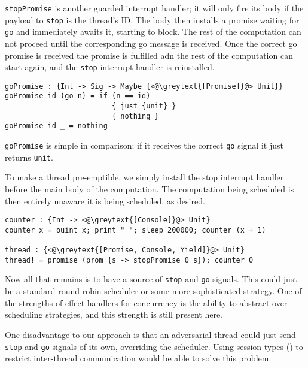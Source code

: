 \documentclass[msc,deptreport,cs]{infthesis} %
\newcommand{\code}[1]{\lstinline{#1}}
\newcommand{\greytext}[1]{\textcolor{black!40}{#1}}
\begin{document}
\code{stopPromise} is another guarded interrupt handler; it will only fire its
body if the payload to \code{stop} is the thread's ID. The body then installs a
promise waiting for \code{go} and immediately awaits it, starting to block. The
rest of the computation can not proceed until the corresponding go message is
received. Once the correct go promise is received the promise is fulfilled adn
the rest of the computation can start again, and the \code{stop} interrupt
handler is reinstalled.

\begin{lstlisting}
goPromise : {Int -> Sig -> Maybe {<@\greytext{[Promise]}@> Unit}}
goPromise id (go n) = if (n == id)
                         { just {unit} }
                         { nothing }
goPromise id _ = nothing
\end{lstlisting}

\code{goPromise} is simple in comparison; if it receives the correct \code{go} signal
it just returns \code{unit}.



To make a thread pre-emptible, we simply install the stop interrupt handler
before the main body of the computation. The computation being scheduled is then
entirely unaware it is being scheduled, as desired.

\begin{lstlisting}
counter : {Int -> <@\greytext{[Console]}@> Unit}
counter x = ouint x; print " "; sleep 200000; counter (x + 1)

thread : {<@\greytext{[Promise, Console, Yield]}@> Unit}
thread! = promise (prom {s -> stopPromise 0 s}); counter 0
\end{lstlisting}

Now all that remains is to have a source of \code{stop} and \code{go} signals.
This could just be a standard round-robin scheduler or some more sophisticated
strategy. One of the strengths of effect handlers for concurrency is the ability
to abstract over scheduling strategies, and this strength is still present here.

One disadvantage to our approach is that an adversarial thread could just send
\code{stop} and \code{go} signals of its own, overriding the scheduler. Using
session types (\cite{honda1998language}) to restrict inter-thread communication
would be able to solve this problem.
\end{document}
